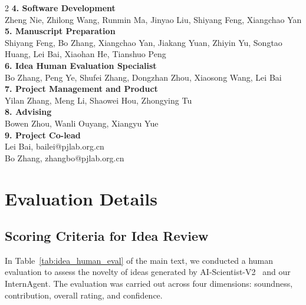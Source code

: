 \documentclass{article}
\begin{document}
\begin{multicols}{2}
\noindent
\textbf{\color{damaired} 4. Software Development} \\  [1.5mm]
\color{damaired} Zheng Nie, Zhilong Wang,  Runmin Ma, Jinyao Liu, Shiyang Feng, Xiangchao Yan \\

\noindent
\textbf{\color{damaired} 5. Manuscript Preparation} \\  [1.5mm]
\color{damaired} Shiyang Feng, Bo Zhang, Xiangchao Yan, Jiakang Yuan, Zhiyin Yu, Songtao Huang, Lei Bai, Xiaohan He, Tianshuo Peng \\

\noindent
\textbf{\color{damaired} 6. Idea Human Evaluation Specialist} \\  [1.5mm]
\color{damaired} Bo Zhang, Peng Ye, Shufei Zhang, Dongzhan Zhou, Xiaosong Wang, Lei Bai \\

\noindent
\textbf{\color{damaired} 7. Project Management and Product} \\  [1.5mm]
\color{damaired} Yilan Zhang, Meng Li, Shaowei Hou, Zhongying Tu \\


\noindent
\textbf{\color{damaiblue} 8. Advising} \\  [1.5mm]
\color{damaiblue} Bowen Zhou, Wanli Ouyang, Xiangyu Yue \\

\noindent
\textbf{\color{damaiblue} 9. Project Co-lead} \\  [1.5mm]
\color{damaiblue} Lei Bai, bailei@pjlab.org.cn \\
\color{damaiblue} Bo Zhang, zhangbo@pjlab.org.cn \\



\end{multicols} %

\section{Evaluation Details}

\subsection{Scoring Criteria for Idea Review}
\label{app:criteria}
In Table~\ref{tab:idea_human_eval} of the main text, we conducted a human evaluation to assess the novelty of ideas generated by AI-Scientist-V2~\citep{yamada2025ai} and our InternAgent. The evaluation was carried out across four dimensions: soundness, contribution, overall rating, and confidence.
\end{document}
